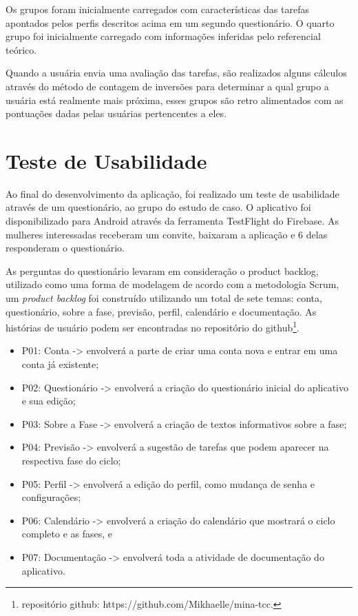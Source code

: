 Os grupos foram inicialmente carregados com características das tarefas apontados pelos perfis descritos acima em um segundo questionário. 
O quarto grupo foi inicialmente carregado com informações inferidas pelo referencial teórico. 

Quando a usuária envia uma avaliação das tarefas, são realizados alguns cálculos através do método de contagem de inversões para determinar 
a qual grupo a usuária está realmente mais próxima, esses grupos são retro alimentados com as pontuações dadas pelas usuárias pertencentes a eles.

\section{Teste de Usabilidade}

Ao final do desenvolvimento da aplicação, foi realizado um teste de usabilidade através de um questionário, ao grupo do estudo de caso. O aplicativo 
foi disponibilizado para Android através da ferramenta TestFlight do Firebase. As mulheres interessadas receberam um convite, baixaram a aplicação e 6 
delas responderam o questionário. 

As perguntas do questionário levaram em consideração o product backlog, utilizado como uma 
forma de modelagem de acordo com a metodologia Scrum, 
um \emph{product backlog} foi construído utilizando um total de 
sete temas: conta, questionário, sobre a fase, previsão, perfil, 
calendário e documentação. As histórias de usuário podem ser 
encontradas no repositório do github\footnote{repositório github: https://github.com/Mikhaelle/mina-tcc.}.

\begin{itemize}
\item P01: Conta -> envolverá a parte de criar uma conta nova e entrar em uma conta já existente;
\item P02: Questionário -> envolverá a criação do questionário inicial do aplicativo e sua edição;
\item P03: Sobre a Fase -> envolverá a criação de textos informativos sobre a fase;
\item P04: Previsão -> envolverá a sugestão de tarefas que podem aparecer na respectiva fase do ciclo;
\item P05: Perfil -> envolverá a edição do perfil, como mudança de senha e configurações;
\item P06: Calendário -> envolverá a criação do calendário que mostrará o ciclo completo e as fases, e
\item P07: Documentação -> envolverá toda a atividade de documentação do aplicativo.

\end{itemize}

